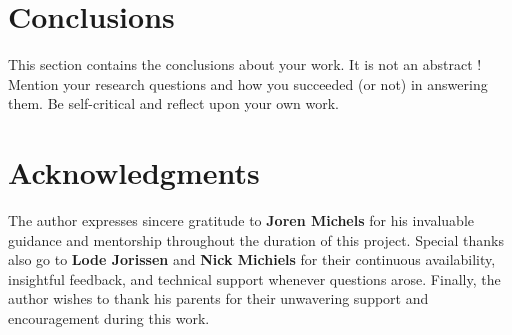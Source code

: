 \documentclass[conference]{IEEEtran}
\begin{document}
\section*{Conclusions}

This section contains the conclusions about your work. It is not an abstract ! Mention your research questions and how you succeeded (or not) in answering them. Be self-critical and reflect upon your own work.

\section*{Acknowledgments}
The author expresses sincere gratitude to \textbf{Joren Michels} for his invaluable guidance and mentorship throughout the duration of this project. Special thanks also go to \textbf{Lode Jorissen} and \textbf{Nick Michiels} for their continuous availability, insightful feedback, and technical support whenever questions arose. Finally, the author wishes to thank his parents for their unwavering support and encouragement during this work.

\end{document}
